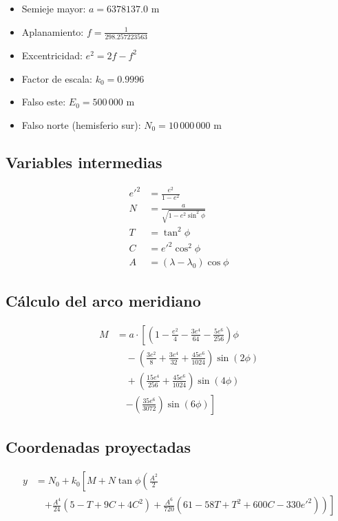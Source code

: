 \documentclass[12pt]{article}
\begin{document}
\begin{itemize}
  \item Semieje mayor: $a = 6378137.0$ m
  \item Aplanamiento: $f = \frac{1}{298.257223563}$
  \item Excentricidad: $e^2 = 2f - f^2$
  \item Factor de escala: $k_0 = 0.9996$
  \item Falso este: $E_0 = 500\,000$ m
  \item Falso norte (hemisferio sur): $N_0 = 10\,000\,000$ m
\end{itemize}

\subsection*{Variables intermedias}

\begin{align*}
e'^2 &= \frac{e^2}{1 - e^2} \\
N &= \frac{a}{\sqrt{1 - e^2 \sin^2 \phi}} \\
T &= \tan^2 \phi \\
C &= e'^2 \cos^2 \phi \\
A &= (\lambda - \lambda_0) \cos \phi
\end{align*}

\subsection*{Cálculo del arco meridiano}

\begin{align*}
M &= a \cdot \left[
(1 - \frac{e^2}{4} - \frac{3e^4}{64} - \frac{5e^6}{256}) \phi \right. \\
&\quad - (\frac{3e^2}{8} + \frac{3e^4}{32} + \frac{45e^6}{1024}) \sin(2\phi) \\
&\quad + (\frac{15e^4}{256} + \frac{45e^6}{1024}) \sin(4\phi) \\
&\quad \left. - (\frac{35e^6}{3072}) \sin(6\phi)
\right]
\end{align*}

\subsection*{Coordenadas proyectadas}

\begin{equation}
\begin{split}
y &= N_0 + k_0 \left[ M + N \tan \phi \left( \frac{A^2}{2} \right.\right. \\
&\quad \left.\left. + \frac{A^4}{24}(5 - T + 9C + 4C^2) + \frac{A^6}{720}(61 - 58T + T^2 + 600C - 330e'^2) \right) \right]
\end{split}
\end{equation}
\end{document}

